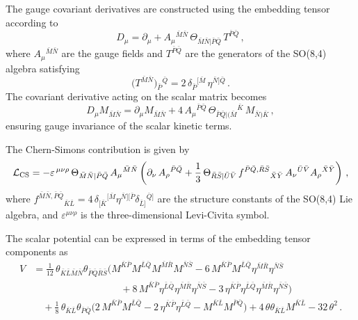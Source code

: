 \documentclass[11pt]{article}
\newcommand{\bK}{{\bar{K}}}
\newcommand{\bL}{{\bar{L}}}
\newcommand{\bM}{{\bar{M}}}
\newcommand{\bN}{{\bar{N}}}
\newcommand{\bP}{{\bar{P}}}
\newcommand{\bQ}{{\bar{Q}}}
\newcommand{\bR}{{\bar{R}}}
\newcommand{\bS}{{\bar{S}}}
\begin{document}
The gauge covariant derivatives are constructed using the embedding tensor according to
%
\begin{equation}
	D_\mu =\partial_\mu + A_\mu{}^{\bM\bN}\,\Theta_{\bM\bN\vert\bP\bQ}\, T^{\bP\bQ}\,,
\end{equation}
%
where $A_\mu{}^{\bM\bN}$ are the gauge fields and $T^{\bP\bQ}$ are the generators of the SO(8,4) algebra satisfying
%
\begin{equation} \label{eq:so84gen_rephrased}
	\big(T^{\bar M\bar N}\big){}_{\bar P}{}^{\bar Q} = 2\,\delta_{\bar P}{}^{[\bar M}\,\eta^{\bar N]\bar Q}\,.
\end{equation}
%
The covariant derivative acting on the scalar matrix becomes
%
\begin{equation}
	D_\mu M_{\bM\bN}=\partial_\mu M_{\bM\bN}+4\,A_\mu{}^{\bP\bQ}\,\Theta_{\bP\bQ\vert(\bM}{}^{\bK}\, M_{\bN)\bK}\,,
\end{equation}
%
ensuring gauge invariance of the scalar kinetic terms.

The Chern-Simons contribution is given by
%
\begin{equation}
	{\cal L}_{\rm CS}= -\varepsilon^{\,\mu\nu\rho}\,\Theta_{\bar M\bar N|\bar P\bar Q}\,A_{\mu}{}^{\bar M\bar N}\left(\partial_{\nu}\,A_{\rho}{}^{\bar P\bar Q}  + \frac{1}{3}\, \Theta_{\bar R\bar S|\bar U\bar V}\,f^{\bar P\bar Q,\bar R\bar S}{}_{\bar X\bar Y}\, A_{\nu}{}^{\bar U\bar V} A_{\rho}{}^{\bar X\bar Y} \right)\,,
\end{equation}
%
where $f^{\bar M\bar N,\bar P\bar Q}{}_{\bar K\bar L} = 4\,\delta_{[\bar K}{}^{[\bar M}\eta^{\bar N][\bar P}\delta_{\bar L]}{}^{\bar Q]}$ are the structure constants of the SO(8,4) Lie algebra, and $\varepsilon^{\mu\nu\rho}$ is the three-dimensional Levi-Civita symbol.

The scalar potential can be expressed in terms of the embedding tensor components as
%
{\setlength\arraycolsep{1.2pt}
	\begin{equation}	\label{eq: scalarpot_rephrased}
		\begin{aligned}
			V	&=	\frac1{12}\,\theta_{\bK\bL\bM\bN}\theta_{\bP\bQ\bR\bS}\Big(M^{\bK\bP}M^{\bL\bQ}M^{\bM\bR}M^{\bN\bS}-6\,M^{\bK\bP}M^{\bL\bQ}\eta^{\bM\bR}\eta^{\bN\bS}\\
			&\qquad\qquad\qquad\qquad\quad+8\,M^{\bK\bP}\eta^{\bL\bQ}\eta^{\bM\bR}\eta^{\bN\bS}-3\,\eta^{\bK\bP}\eta^{\bL\bQ}\eta^{\bM\bR}\eta^{\bN\bS}\Big)\\
			&\quad +\frac1{8}\,\theta_{\bK\bL}\theta_{\bP\bQ}\Big(2\,M^{\bK\bP}M^{\bL\bQ}-2\,\eta^{\bK\bP}\eta^{\bL\bQ}-M^{\bK\bL}M^{\bP\bQ}\Big)+4\,\theta\theta_{\bK\bL}M^{\bK\bL}-32\,\theta^2\,.
		\end{aligned}
	\end{equation}
}
\end{document}
